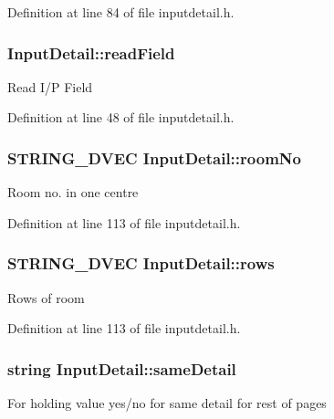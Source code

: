 Definition at line 84 of file inputdetail.\-h.

\hypertarget{classInputDetail_ac0cc70b017ef94fb55acb46fc44f0df5}{
\subsubsection[{read\-Field}]{ Input\-Detail\-::read\-Field\hspace{0.3cm}{\ttfamily [protected]}}}\label{classInputDetail_ac0cc70b017ef94fb55acb46fc44f0df5}
Read I/\-P Field 

Definition at line 48 of file inputdetail.\-h.

\hypertarget{classInputDetail_a3193354764ba0b44b2eb4b366b4c273a}{
\subsubsection[{room\-No}]{\setlength{\rightskip}{0pt plus 5cm}S\-T\-R\-I\-N\-G\-\_\-D\-V\-E\-C Input\-Detail\-::room\-No\hspace{0.3cm}{\ttfamily [protected]}}}\label{classInputDetail_a3193354764ba0b44b2eb4b366b4c273a}
Room no. in one centre 

Definition at line 113 of file inputdetail.\-h.

\hypertarget{classInputDetail_aa203edbcfd4083624dbc4dc055c1e6e5}{
\subsubsection[{rows}]{\setlength{\rightskip}{0pt plus 5cm}S\-T\-R\-I\-N\-G\-\_\-D\-V\-E\-C Input\-Detail\-::rows\hspace{0.3cm}{\ttfamily [protected]}}}\label{classInputDetail_aa203edbcfd4083624dbc4dc055c1e6e5}
Rows of room 

Definition at line 113 of file inputdetail.\-h.

\hypertarget{classInputDetail_a13313d76b2ccc308634a7d802a46936a}{
\subsubsection[{same\-Detail}]{\setlength{\rightskip}{0pt plus 5cm}string Input\-Detail\-::same\-Detail\hspace{0.3cm}{\ttfamily [protected]}}}\label{classInputDetail_a13313d76b2ccc308634a7d802a46936a}
For holding value yes/no for same detail for rest of pages 

